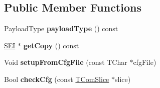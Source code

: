 \subsection*{Public Member Functions}
\begin{DoxyCompactItemize}
\item 
\mbox{\label{class_s_e_i_alpha_channel_info_a9e063bd85f2581297a7130ee7a7d8d93}} 
Payload\+Type {\bfseries payload\+Type} () const
\item 
\mbox{\label{class_s_e_i_alpha_channel_info_a75847698268c91c11d78e83e6275718f}} 
\hyperlink{class_s_e_i}{S\+EI} $\ast$ {\bfseries get\+Copy} () const
\item 
\mbox{\label{class_s_e_i_alpha_channel_info_a3a47dd2607947f3c1d4a01abad57b593}} 
Void {\bfseries setup\+From\+Cfg\+File} (const T\+Char $\ast$cfg\+File)
\item 
\mbox{\label{class_s_e_i_alpha_channel_info_aba08ffb61f80069ada728c42bde7aa96}} 
Bool {\bfseries check\+Cfg} (const \hyperlink{class_t_com_slice}{T\+Com\+Slice} $\ast$slice)
\end{DoxyCompactItemize}
